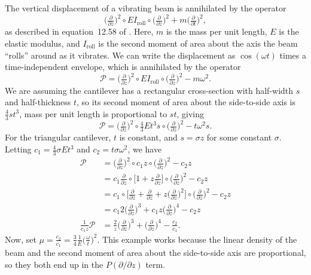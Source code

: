 \documentclass{article}
\theoremstyle{definition}
\theoremstyle{plain}
\newenvironment{verify}{\color{ForestGreen}}{\color{black}}
\begin{document}
\begin{verify}
The vertical displacement of a vibrating beam is annihilated by the operator
\[ \big(\tfrac{\partial}{\partial z}\big)^2 \circ EI_\text{roll} \circ \big(\tfrac{\partial}{\partial z}\big)^2 + m \big(\tfrac{\partial}{\partial t}\big)^2, \]
as described in equation~12.58 of \cite{genta2009vibration}. Here, $m$ is the mass per unit length, $E$ is the elastic modulus, and $I_\text{roll}$ is the second moment of area about the axis the beam ``rolls'' around as it vibrates. We can write the displacement as $\cos(\omega t)$ times a time-independent envelope, which is annihilated by the operator
\[ \mathcal{P} = \big(\tfrac{\partial}{\partial z}\big)^2 \circ EI_\text{roll} \circ \big(\tfrac{\partial}{\partial z}\big)^2 - m\omega^2. \]
We are assuming the cantilever has a rectangular cross-section with half-width $s$ and half-thickness $t$, so its second moment of area about the side-to-side axis is $\tfrac{4}{3}st^3$, mass per unit length is proportional to $st$, giving
\[ \mathcal{P} = \big(\tfrac{\partial}{\partial z}\big)^2 \circ \tfrac{4}{3}Et^3 s \circ \big(\tfrac{\partial}{\partial z}\big)^2 - t\omega^2 s. \]
For the triangular cantilever, $t$ is constant, and $s = \sigma z$ for some constant $\sigma$. Letting $c_1 = \tfrac{4}{3}\sigma Et^3$ and $c_2 = t\sigma\omega^2$, we have
\begin{align*}
\mathcal{P} & = \big(\tfrac{\partial}{\partial z}\big)^2 \circ c_1 z \circ \big(\tfrac{\partial}{\partial z}\big)^2 - c_2 z \\
& = c_1 \tfrac{\partial}{\partial z} \circ \big[ 1 + z \tfrac{\partial}{\partial z} \big] \circ \big(\tfrac{\partial}{\partial z}\big)^2 - c_2 z \\
& = c_1 \circ \big[ \tfrac{\partial}{\partial z} + \tfrac{\partial}{\partial z} + z \big(\tfrac{\partial}{\partial z}\big)^2 \big] \circ \big(\tfrac{\partial}{\partial z}\big)^2 - c_2 z \\
& = c_1 2\big(\tfrac{\partial}{\partial z}\big)^3 + c_1 z \big(\tfrac{\partial}{\partial z}\big)^4 - c_2 z \\
\tfrac{1}{c_1 z} \mathcal{P} & = \tfrac{2}{z} \big(\tfrac{\partial}{\partial z}\big)^3 + \big(\tfrac{\partial}{\partial z}\big)^4 - \tfrac{c_2}{c_1}.
\end{align*}
Now, set $\mu = \tfrac{c_2}{c_1} = \tfrac{3}{4} \tfrac{1}{E} \big(\tfrac{\omega}{t}\big)^2$. This example works because the linear density of the beam and the second moment of area about the side-to-side axis are proportional, so they both end up in the $P(\partial/\partial z)$ term.\par
\end{verify}
\end{document}
